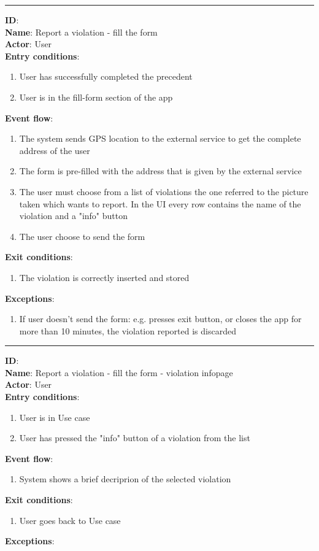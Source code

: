   \rule{\linewidth}{0.4pt}
  \textbf{ID}:  \\
  \textbf{Name}: Report a violation - fill the form \\
  \textbf{Actor}: User   \\
  \textbf{Entry conditions}:
  \begin{enumerate}
    \item{User has successfully completed the precedent }
    \item{User is in the fill-form section of the app}
  \end{enumerate}
  \textbf{Event flow}:
  \begin{enumerate}
    \item{The system sends GPS location to the external service to get the complete address of the user}
    \item{The form is pre-filled with the address that is given by the external service}
    \item{The user must choose from a list of violations the one referred to the picture taken which wants to report. In the UI every row contains the name of the violation and a "info" button}
    \item{The user choose to send the form}
  \end{enumerate}
  \textbf{Exit conditions}:
  \begin{enumerate}
    \item{The violation is correctly inserted and stored}
  \end{enumerate}
  \textbf{Exceptions}:
  \begin{enumerate}
		\item{If user doesn't send the form: e.g. presses exit button, or closes the app for more than 10 minutes, the violation reported is discarded}
  \end{enumerate}
  \rule{\linewidth}{0.4pt}
  \textbf{ID}:  \\
  \textbf{Name}: Report a violation - fill the form - violation infopage \\
  \textbf{Actor}: User   \\
  \textbf{Entry conditions}:
  \begin{enumerate}
    \item{User is in Use case  }
    \item{User has pressed the "info" button of a violation from the list }
  \end{enumerate}
  \textbf{Event flow}:
  \begin{enumerate}
    \item{System shows a brief decriprion of the selected violation}
  \end{enumerate}
  \textbf{Exit conditions}:
  \begin{enumerate}
    \item{User goes back to Use case }
  \end{enumerate}
  \textbf{Exceptions}:

